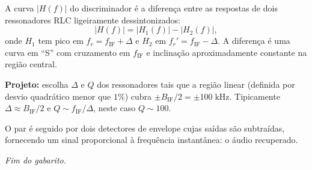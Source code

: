 \documentclass[11pt,a4paper]{article}
\begin{document}
\begin{resolucao}

A curva $|H(f)|$ do discriminador é a diferença entre as respostas de dois ressonadores RLC ligeiramente dessintonizados:
\[
  |H(f)| = |H_1(f)| - |H_2(f)|,
\]
onde $H_1$ tem pico em $f_r = f_{\text{IF}} + \Delta$ e $H_2$ em $f_r' = f_{\text{IF}} - \Delta$. A diferença é uma curva em ``S'' com cruzamento em $f_{\text{IF}}$ e inclinação aproximadamente constante na região central.

\textbf{Projeto:} escolha $\Delta$ e $Q$ dos ressonadores tais que a região linear (definida por desvio quadrático menor que $1\%$) cubra $\pm B_{\text{IF}}/2 = \pm 100\;\text{kHz}$. Tipicamente $\Delta \approx B_{\text{IF}}/2$ e $Q \sim f_{\text{IF}}/\Delta$, neste caso $Q \sim 100$.

O par é seguido por dois detectores de envelope cujas saídas são subtraídas, fornecendo um sinal proporcional à frequência instantânea: o áudio recuperado.
\end{resolucao}

\vfill
\begin{center}
  \small\textit{Fim do gabarito.}
\end{center}
\end{document}
